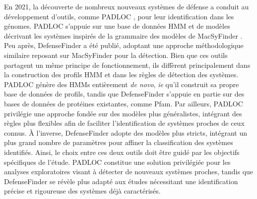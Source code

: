 En 2021, la découverte de nombreux nouveaux systèmes de défense a conduit au développement d’outils, comme PADLOC \cite{payne_identification_2021}, pour leur identification dans les génomes. PADLOC s’appuie sur une base de données HMM et de modèles décrivant les systèmes inspirés de la grammaire des modèles de MacSyFinder \cite{abby_macsyfinder_2014}. Peu après, DefenseFinder \cite{tesson_systematic_2022} a été publié, adoptant une approche méthodologique similaire reposant sur MacSyFinder pour la détection.
Bien que ces outils partagent un même principe de fonctionnement, ils diffèrent principalement dans la construction des profils HMM et dans les règles de détection des systèmes. PADLOC génère des HMMs entièrement \textit{de novo}, \textit{ie} qu'il construit sa propre base de données de profils, tandis que DefenseFinder s’appuie en partie sur des bases de données de protéines existantes, comme Pfam\cite{mistry_pfam_2021}. Par ailleurs, PADLOC privilégie une approche fondée sur des modèles plus généralistes, intégrant des règles plus flexibles afin de faciliter l’identification de systèmes proches de ceux connus. À l’inverse, DefenseFinder adopte des modèles plus stricts, intégrant un plus grand nombre de paramètres pour affiner la classification des systèmes identifiés.
Ainsi, le choix entre ces deux outils doit être guidé par les objectifs spécifiques de l’étude. PADLOC constitue une solution privilégiée pour les analyses exploratoires visant à détecter de nouveaux systèmes proches, tandis que DefenseFinder se révèle plus adapté aux études nécessitant une identification précise et rigoureuse des systèmes déjà caractérisés.